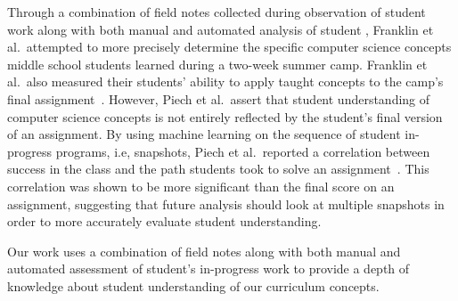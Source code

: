 Through a combination of field notes collected during observation of student
work along with both manual and automated analysis of student ,
Franklin et al.\ attempted to more precisely determine the specific computer
science concepts middle school students learned during a two-week summer
camp. Franklin et al.\ also measured their students' ability to apply taught
concepts to the camp's final assignment~\cite{Boe:2013:HLS:2445196.2445265,
  Franklin:2013:SBO}. However, Piech et al.\ assert that student understanding
of computer science concepts is not entirely reflected by the student's final
version of an assignment. By using machine learning on the sequence of student
in-progress programs, i.e, snapshots, Piech et al.\ reported a correlation
between success in the class and the path students took to solve an
assignment~\cite{Piech:2012:MSL:2157136.2157182}. This correlation was shown to
be more significant than the final score on an assignment, suggesting that
future analysis should look at multiple snapshots in order to more accurately
evaluate student understanding.

Our work uses a combination of field notes along with both manual and automated
assessment of student's in-progress work to provide a depth of knowledge about
student understanding of our curriculum concepts.

